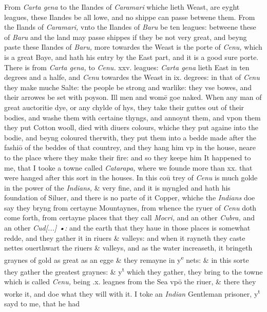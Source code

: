 \documentclass[11pt,twoside]{article}\makeatletter
\def\gap{}
\begin{document}
From {\itshape Carta gena} to the Ilandes of {\itshape Caramari} whiche lieth 
	\normalmarginpar
      \marginnote{Cara[...] {\gap ••••}.} Weast, are eyght leagues, these Ilandes be all lowe, and no shippe can passe betwene them. From the Ilands of {\itshape Caramari,} %
 vnto the Ilandes of {\itshape Baru} be ten leagues: betweene these of {\itshape Baru} and the land may passe shippes if they be not very great, and beyng paste these Ilandes of {\itshape Baru,} more towardes the Weast is the porte of {\itshape Cenu,} which is a great Baye, and hath his entry by the East part, and it is a good sure porte. There is 
	\normalmarginpar
       from {\itshape Carta gena,} to {\itshape Cenu.} xxv. leagues: {\itshape Carta gena} lieth East in ten degrees and a halfe, and {\itshape Cenu} towardes the Weast in ix. degrees: in that of {\itshape Cenu} they make muche Salte: the peo­ple be strong and warlike: they vse bowes, and their arrowes be set with poyson. Ill men and womē goe naked. When a­ny man of great auctoritie dye, or any chylde of hys, they take their guttes out of their bodies, and washe them with certaine thyngs, and annoynt them, and vpon them they put Cotton wooll, died with diuers colours, whiche they put againe into the bodie, and beyng coloured therwith, they put them into a bedde made after the fashiō of the beddes of that countrey, and they hang him vp in the house, neare to the place where they make their fire: and so they keepe him It happened to me, that I tooke a towne called {\itshape Catarapa,} where we founde more than xx. that were hanged after this sort in the houses. In this coū ­trey of {\itshape Cenu} is much golde in the power of the {\itshape Indians,} \& very fine, and it is myngled and hath his foundation of Siluer, and there is no parte of it Copper, whiche the {\itshape Indians} doe say they bryng from certayne Mountaynes, from whence the ryuer of {\itshape Cenu} doth come forth, from certayne places that they call {\itshape Mocri,} and an other {\itshape Cubra,} and an other {\itshape Cud[...] {\gap •}:} and the earth that they haue in those places is somewhat redde, and 
	\normalmarginpar
       they gather it in riuers \& valleys: and when it rayneth they caste nettes ouerthwart the riuers \& valleys, and as the wa­ter increaseth, it bringeth graynes of gold as great as an egge \& they remayne in y\textsuperscript{e} nets: \& in this sorte they gather the grea­test graynes: \& y\textsuperscript{t} which they gather, they bring to the towne which is called {\itshape Cenu,} being .x. leagnes from the Sea vpō the riuer, \& there they worke it, and doe what they will with it. I toke an {\itshape Indian} Gentleman prisoner, y\textsuperscript{t} sayd to me, that he had %
\end{document}
